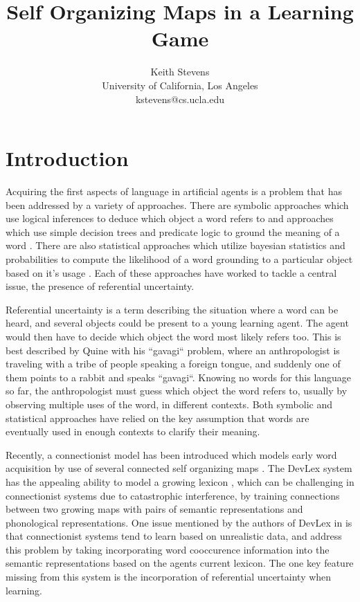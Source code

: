 \documentclass[a4paper,11pt]{article}
\title{Self Organizing Maps in a Learning Game}
\author{Keith Stevens \\ University of California, Los Angeles \\
kstevens@cs.ucla.edu}
\date{}
\begin{document}
\maketitle

\section{Introduction}
Acquiring the first aspects of language in artificial agents is a problem that
has been addressed by a variety of approaches.  There are symbolic approaches
which use logical inferences to deduce which object a word refers to
\cite{Siskind} and approaches which use simple decision trees and predicate
logic to ground the meaning of a word \cite{GoldNico}.  There are also
statistical approaches which utilize bayesian statistics  and probabilities to
compute the likelihood of a word grounding to a particular object based on it's
usage \cite{FazlyProbRefUn,SmithCommSystem,VogtSocial}.  Each of these
approaches have worked to tackle a central issue, the presence of referential
uncertainty.  

Referential uncertainty is a term describing the situation where a word can be
heard, and several objects could be present to a young learning agent.  The
agent would then have to decide which object the word most likely refers too.
This is best described by Quine \cite{Quine} with his ``gavagi`` problem, where
an anthropologist is traveling with a tribe of people speaking a foreign tongue,
and suddenly one of them points to a rabbit and speaks ``gavagi``.  Knowing no
words for this language so far, the anthropologist must guess which object the
word refers to, usually by observing multiple uses of the word, in different
contexts.  Both symbolic and statistical approaches have relied on the key
assumption that words are eventually used in enough contexts to clarify their
meaning.

Recently, a connectionist model has been introduced which models early word
acquisition by use of several connected self organizing maps
\cite{LiDevLex,MiikDisLex}.  The DevLex system has the appealing ability to
model a growing lexicon \cite{LiDevLex}, which can be challenging in
connectionist systems due to catastrophic interference, by training connections
between two growing maps with pairs of semantic representations and phonological
representations.  One issue mentioned by the authors of DevLex in
\cite{FarkasWcd} is that connectionist systems tend to learn based on
unrealistic data, and address this problem by taking incorporating word
cooccurence information into the semantic representations based on the agents
current lexicon.  The one key feature missing from this system is the
incorporation of referential uncertainty when learning.
\end{document}
